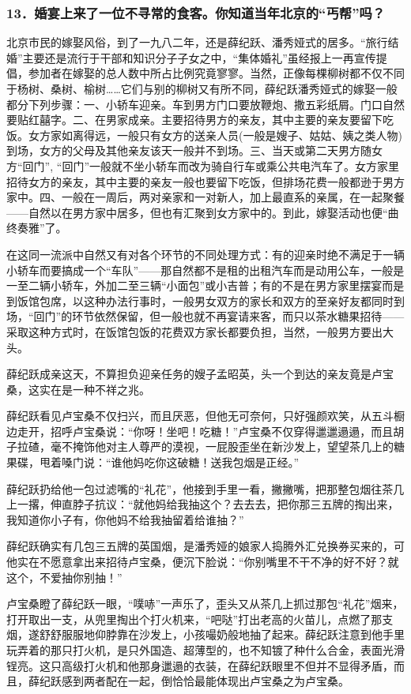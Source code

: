 \subsubsection*{13．婚宴上来了一位不寻常的食客。你知道当年北京的“丐帮”吗？}
\par 北京市民的嫁娶风俗，到了一九八二年，还是薛纪跃、潘秀娅式的居多。“旅行结婚”主要还是流行于干部和知识分子子女之中，“集体婚礼”虽经报上一再宣传提倡，参加者在嫁娶的总人数中所占比例究竟寥寥。当然，正像每棵柳树都不仅不同于杨树、桑树、榆树……它们与别的柳树又有所不同，薛纪跃潘秀娅式的嫁娶一般都分下列步骤：一、小轿车迎亲。车到男方门口要放鞭炮、撒五彩纸屑。门口自然要贴红囍字。二、在男家成亲。主要招待男方的亲友，其中主要的亲友要留下吃饭。女方家如离得远，一般只有女方的送亲人员(一般是嫂子、姑姑、姨之类人物)到场，女方的父母及其他亲友该天一般并不到场。三、当天或第二天男方随女方“回门”, “回门”一般就不坐小轿车而改为骑自行车或乘公共电汽车了。女方家里招待女方的亲友，其中主要的亲友一般也要留下吃饭，但排场花费一般都逊于男方家中。四、一般在一周后，两对亲家和一对新人，加上最直系的亲属，在一起聚餐——自然以在男方家中居多，但也有汇聚到女方家中的。到此，嫁娶活动也便“曲终奏雅”了。
\par 在这同一流派中自然又有对各个环节的不同处理方式：有的迎亲时绝不满足于一辆小轿车而要搞成一个“车队”——那自然都不是租的出租汽车而是动用公车，一般是一至二辆小轿车，外加二至三辆“小面包”或小吉普；有的不是在男方家里摆宴而是到饭馆包席，以这种办法行事时，一般男女双方的家长和双方的至亲好友都同时到场，“回门”的环节依然保留，但一般也就不再宴请来客，而只以茶水糖果招待——采取这种方式时，在饭馆包饭的花费双方家长都要负担，当然，一般男方要出大头。
\par 薛纪跃成亲这天，不算担负迎亲任务的嫂子孟昭英，头一个到达的亲友竟是卢宝桑，这实在是一种不祥之兆。
\par 薛纪跃看见卢宝桑不仅扫兴，而且厌恶，但他无可奈何，只好强颜欢笑，从五斗橱边走开，招呼卢宝桑说：“你呀！坐吧！吃糖！”卢宝桑不仅穿得邋邋遢遢，而且胡子拉碴，毫不掩饰他对主人尊严的漠视，一屁股歪坐在新沙发上，望望茶几上的糖果碟，甩着嗓门说：“谁他妈吃你这破糖！送我包烟是正经。”
\par 薛纪跃扔给他一包过滤嘴的“礼花”，他接到手里一看，撇撇嘴，把那整包烟往茶几上一撂，伸直脖子抗议：“就他妈给我抽这个？去去去，把你那三五牌的掏出来，我知道你小子有，你他妈不给我抽留着给谁抽？”
\par 薛纪跃确实有几包三五牌的英国烟，是潘秀娅的娘家人捣腾外汇兑换券买来的，可他实在不愿意拿出来招待卢宝桑，便沉下脸说：“你别嘴里不干不净的好不好？就这个，不爱抽你别抽！”
\par 卢宝桑瞪了薛纪跃一眼，“噗哧”一声乐了，歪头又从茶几上抓过那包“礼花”烟来，打开取出一支，从兜里掏出个打火机来，“吧哒”打出老高的火苗儿，点燃了那支烟，遂舒舒服服地仰脖靠在沙发上，小孩嘬奶般地抽了起来。薛纪跃注意到他手里玩弄着的那只打火机，是只外国造、超薄型的，也不知镀了种什么合金，表面光滑锃亮。这只高级打火机和他那身邋遢的衣装，在薛纪跃眼里不但并不显得矛盾，而且，薛纪跃感到两者配在一起，倒恰恰最能体现出卢宝桑之为卢宝桑。
